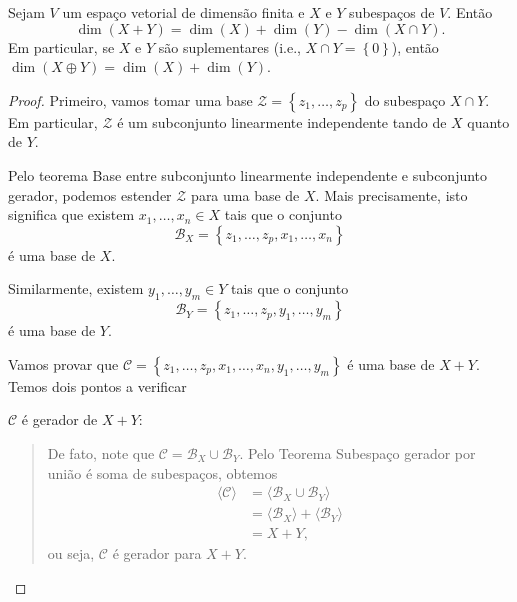 \begin{theorem}
	Sejam \(V\) um espaço vetorial de dimensão finita e \(X\) e \(Y\) subespaços de \(V\). Então
	\[\dim(X+Y)=\dim(X)+\dim(Y)-\dim(X\cap Y).\]
	Em particular, se \(X\) e \(Y\) são suplementares (i.e., $X\cap Y=\left\{0\right\}$), então $\dim(X\oplus Y)=\dim(X)+\dim(Y)$.
\end{theorem}
\begin{proof}
	Primeiro, vamos tomar uma base $\mathcal{Z}=\left\{z_1,\ldots,z_p\right\}$ do subespaço $X\cap Y$. Em particular, $\mathcal{Z}$ é um subconjunto linearmente independente tando de $X$ quanto de $Y$.
	
	Pelo teorema Base entre subconjunto linearmente independente e subconjunto gerador, podemos estender $\mathcal{Z}$ para uma base de $X$. Mais precisamente, isto significa que existem $x_1,\ldots,x_n\in X$ tais que o conjunto
	\[\mathcal{B}_X=\left\{z_1,\ldots,z_p,x_1,\ldots,x_n\right\}\]
	é uma base de $X$.
	
	Similarmente, existem $y_1,\ldots,y_m\in Y$ tais que o conjunto
	\[\mathcal{B}_Y=\left\{z_1,\ldots,z_p,y_1,\ldots,y_m\right\}\]
	é uma base de $Y$.
	
	Vamos provar que $\mathcal{C}=\left\{z_1,\ldots,z_p,x_1,\ldots,x_n,y_1,\ldots,y_m\right\}$ é uma base de $X+Y$. Temos dois pontos a verificar
	
	$\mathcal{C}$ é gerador de $X+Y$:
	\begin{quote}
		De fato, note que $\mathcal{C}=\mathcal{B}_X\cup\mathcal{B}_Y$. Pelo Teorema Subespaço gerador por união é soma de subespaços, obtemos
		\begin{align*}
			\langle\mathcal{C}\rangle&=\langle \mathcal{B}_X\cup\mathcal{B}_Y\rangle\\
			&=\langle\mathcal{B}_X\rangle+\langle\mathcal{B}_Y\rangle\\
			&=X+Y,
		\end{align*}
		ou seja, $\mathcal{C}$ é gerador para $X+Y$.
	\end{quote}
	

\end{proof}
